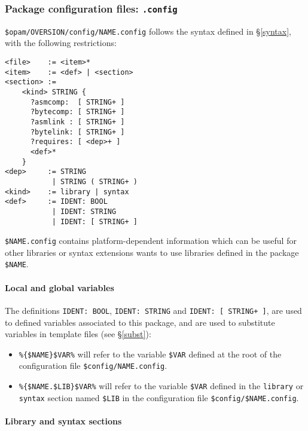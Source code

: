 \documentclass[a4paper,11pt]{article}
\begin{document}
\subsubsection{Package configuration files: {\tt .config}}
\label{dotconfig}

\verb+$opam/OVERSION/config/NAME.config+ follows the syntax defined in
\S\ref{syntax}, with the following restrictions:

{\small
\begin{Verbatim}[frame=single]
<file>    := <item>*
<item>    := <def> | <section>
<section> :=
    <kind> STRING {
      ?asmcomp:  [ STRING+ ]
      ?bytecomp: [ STRING+ ]
      ?asmlink : [ STRING+ ]
      ?bytelink: [ STRING+ ]
      ?requires: [ <dep>+ ]
      <def>*
    }
<dep>     := STRING 
           | STRING ( STRING+ )
<kind>    := library | syntax
<def>     := IDENT: BOOL
           | IDENT: STRING
           | IDENT: [ STRING+ ]
\end{Verbatim}
}

\verb+$NAME.config+ contains platform-dependent information which can
be useful for other libraries or syntax extensions wants to use
libraries defined in the package \verb+$NAME+.

\paragraph{Local and global variables}

The definitions {\tt IDENT: BOOL}, {\tt IDENT: STRING} and {\tt IDENT:
  [ STRING+ ]}, are used to defined variables associated to this
package, and are used to substitute variables in template files (see
\S\ref{subst}):

\begin{itemize}

\item \verb+%{$NAME}$VAR%+ will refer to the variable \verb+$VAR+
  defined at the root of the configuration file \verb+$config/NAME.config+.

\item \verb+%{$NAME.$LIB}$VAR%+ will refer to the variable \verb+$VAR+
  defined in the {\tt library} or {\tt syntax} section named
  \verb+$LIB+ in the configuration file \verb+$config/$NAME.config+.

\end{itemize}

\paragraph{Library and syntax sections}
\end{document}
